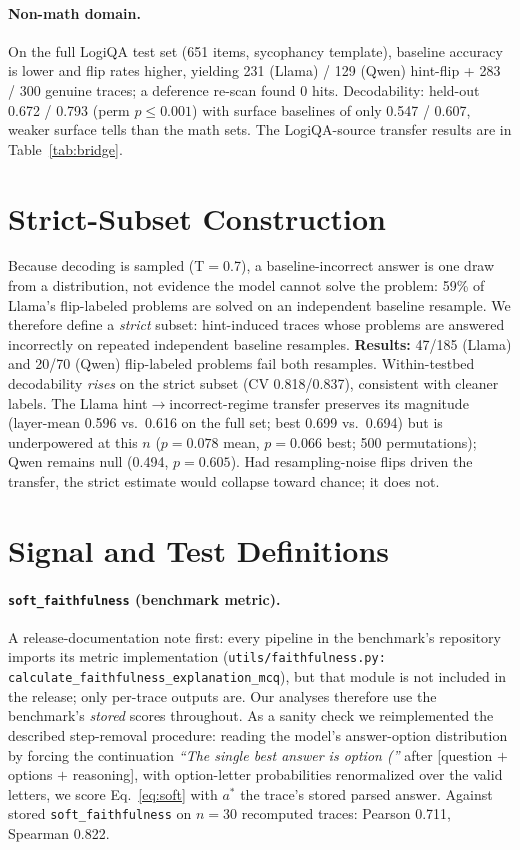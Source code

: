 \documentclass[11pt]{article}
\begin{document}
\paragraph{Non-math domain.} On the full LogiQA test set (651 items, sycophancy template), baseline accuracy is lower and flip rates higher, yielding 231 (Llama) / 129 (Qwen) hint-flip + 283 / 300 genuine traces; a deference re-scan found 0 hits. Decodability: held-out 0.672 / 0.793 (perm $p{\leq}0.001$) with surface baselines of only 0.547 / 0.607, weaker surface tells than the math sets. The LogiQA-source transfer results are in Table~\ref{tab:bridge}.

\section{Strict-Subset Construction}
\label{app:strict}
Because decoding is sampled (T$=$0.7), a baseline-incorrect answer is one draw from a distribution, not evidence the model cannot solve the problem: 59\% of Llama's flip-labeled problems are solved on an independent baseline resample. We therefore define a \emph{strict} subset: hint-induced traces whose problems are answered incorrectly on repeated independent baseline resamples. \textbf{Results:} 47/185 (Llama) and 20/70 (Qwen) flip-labeled problems fail both resamples. Within-testbed decodability \emph{rises} on the strict subset (CV 0.818/0.837), consistent with cleaner labels. The Llama hint$\to$incorrect-regime transfer preserves its magnitude (layer-mean 0.596 vs.\ 0.616 on the full set; best 0.699 vs.\ 0.694) but is underpowered at this $n$ ($p{=}0.078$ mean, $p{=}0.066$ best; 500 permutations); Qwen remains null (0.494, $p{=}0.605$). Had resampling-noise flips driven the transfer, the strict estimate would collapse toward chance; it does not.

\section{Signal and Test Definitions}
\label{app:defs}

\paragraph{\texttt{soft\_faithfulness} (benchmark metric).} A release-documentation note first: every pipeline in the benchmark's repository imports its metric implementation (\texttt{utils/faithfulness.py:} \texttt{calculate\_faithfulness\_explanation\_mcq}), but that module is not included in the release; only per-trace outputs are. Our analyses therefore use the benchmark's \emph{stored} scores throughout. As a sanity check we reimplemented the described step-removal procedure: reading the model's answer-option distribution by forcing the continuation \emph{``The single best answer is option (''} after [question $+$ options $+$ reasoning], with option-letter probabilities renormalized over the valid letters, we score Eq.~\ref{eq:soft} with $a^{\ast}$ the trace's stored parsed answer. Against stored \texttt{soft\_faithfulness} on $n{=}30$ recomputed traces: Pearson 0.711, Spearman 0.822.
\end{document}
